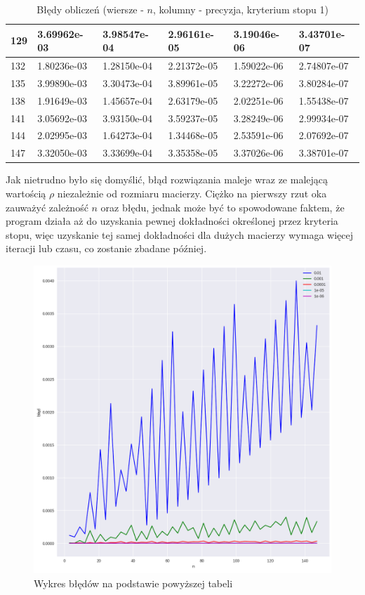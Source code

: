 \documentclass{article}
\begin{document}
\begin{table}[H]
\begin{tabular}{|l|l|l|l|l|l|}
129 & 3.69962e-03 & 3.98547e-04 & 2.96161e-05 & 3.19046e-06 & 3.43701e-07 \\ \hline
132 & 1.80236e-03 & 1.28150e-04 & 2.21372e-05 & 1.59022e-06 & 2.74807e-07 \\ \hline
135 & 3.99890e-03 & 3.30473e-04 & 3.89961e-05 & 3.22272e-06 & 3.80284e-07 \\ \hline
138 & 1.91649e-03 & 1.45657e-04 & 2.63179e-05 & 2.02251e-06 & 1.55438e-07 \\ \hline
141 & 3.05692e-03 & 3.93150e-04 & 3.59237e-05 & 3.28249e-06 & 2.99934e-07 \\ \hline
144 & 2.02995e-03 & 1.64273e-04 & 1.34468e-05 & 2.53591e-06 & 2.07692e-07 \\ \hline
147 & 3.32050e-03 & 3.33699e-04 & 3.35358e-05 & 3.37026e-06 & 3.38701e-07 \\ \hline
\end{tabular}
\caption{Błędy obliczeń (wiersze - $n$, kolumny - precyzja, kryterium stopu 1)}
\end{table}

Jak nietrudno było się domyślić, błąd rozwiązania maleje wraz ze malejącą wartością $\rho$ niezależnie od rozmiaru
macierzy. Ciężko na pierwszy rzut oka zauważyć zależność $n$ oraz błędu, jednak może być to spowodowane faktem, że program
działa aż do uzyskania pewnej dokładności określonej przez kryteria stopu, więc uzyskanie tej samej dokładności dla 
dużych macierzy wymaga więcej iteracji lub czasu, co zostanie zbadane później.

\begin{figure}[H]
    \centering
    \includegraphics[width=\textwidth]{img/plot_1.png}
    \caption{Wykres błędów na podstawie powyższej tabeli}
\end{figure}
\end{document}
